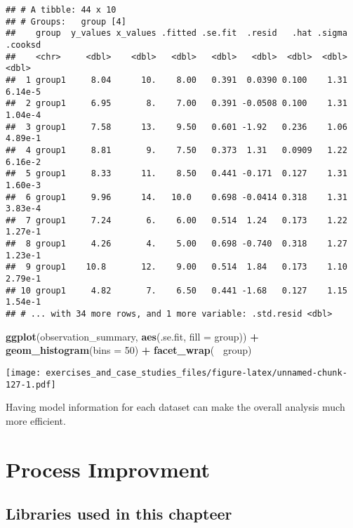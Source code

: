 \documentclass[]{book}
\newenvironment{Shaded}{\begin{snugshade}}{\end{snugshade}}
\newcommand{\DataTypeTok}[1]{\textcolor[rgb]{0.13,0.29,0.53}{#1}}
\newcommand{\DecValTok}[1]{\textcolor[rgb]{0.00,0.00,0.81}{#1}}
\newcommand{\KeywordTok}[1]{\textcolor[rgb]{0.13,0.29,0.53}{\textbf{#1}}}
\newcommand{\NormalTok}[1]{#1}
\newcommand{\OperatorTok}[1]{\textcolor[rgb]{0.81,0.36,0.00}{\textbf{#1}}}
\newcommand{\StringTok}[1]{\textcolor[rgb]{0.31,0.60,0.02}{#1}}
\theoremstyle{definition}
\theoremstyle{definition}
\theoremstyle{definition}
\theoremstyle{remark}
\begin{document}
\begin{verbatim}
## # A tibble: 44 x 10
## # Groups:   group [4]
##    group  y_values x_values .fitted .se.fit  .resid   .hat .sigma  .cooksd
##    <chr>     <dbl>    <dbl>   <dbl>   <dbl>   <dbl>  <dbl>  <dbl>    <dbl>
##  1 group1     8.04      10.    8.00   0.391  0.0390 0.100    1.31  6.14e-5
##  2 group1     6.95       8.    7.00   0.391 -0.0508 0.100    1.31  1.04e-4
##  3 group1     7.58      13.    9.50   0.601 -1.92   0.236    1.06  4.89e-1
##  4 group1     8.81       9.    7.50   0.373  1.31   0.0909   1.22  6.16e-2
##  5 group1     8.33      11.    8.50   0.441 -0.171  0.127    1.31  1.60e-3
##  6 group1     9.96      14.   10.0    0.698 -0.0414 0.318    1.31  3.83e-4
##  7 group1     7.24       6.    6.00   0.514  1.24   0.173    1.22  1.27e-1
##  8 group1     4.26       4.    5.00   0.698 -0.740  0.318    1.27  1.23e-1
##  9 group1    10.8       12.    9.00   0.514  1.84   0.173    1.10  2.79e-1
## 10 group1     4.82       7.    6.50   0.441 -1.68   0.127    1.15  1.54e-1
## # ... with 34 more rows, and 1 more variable: .std.resid <dbl>
\end{verbatim}

\begin{Shaded}
\begin{Highlighting}[]
\KeywordTok{ggplot}\NormalTok{(observation_summary, }\KeywordTok{aes}\NormalTok{(.se.fit, }\DataTypeTok{fill =}\NormalTok{ group)) }\OperatorTok{+}
\StringTok{  }\KeywordTok{geom_histogram}\NormalTok{(}\DataTypeTok{bins =} \DecValTok{50}\NormalTok{) }\OperatorTok{+}
\StringTok{  }\KeywordTok{facet_wrap}\NormalTok{(}\OperatorTok{~}\StringTok{ }\NormalTok{group)}
\end{Highlighting}
\end{Shaded}

\texttt{[image: exercises\_and\_case\_studies\_files/figure-latex/unnamed-chunk-127-1.pdf]}

Having model information for each dataset can make the overall analysis
much more efficient.

\hypertarget{process-improvment}{%
\chapter{Process Improvment}\label{process-improvment}}

\hypertarget{libraries-used-in-this-chapteer}{%
\section{Libraries used in this
chapteer}\label{libraries-used-in-this-chapteer}}
\end{document}
